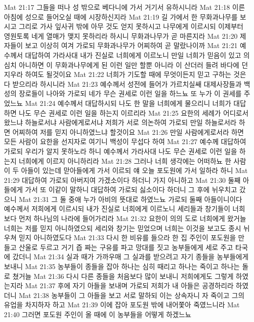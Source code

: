 Mat 21:17  그들을 떠나 성 밖으로 베다니에 가서 거기서 유하시니라
Mat 21:18  이른 아침에 성으로 들어오실 때에 시장하신지라
Mat 21:19  길 가에서 한 무화과나무를 보시고 그리로 가사 잎사귀 밖에 아무 것도 얻지 못하시고 나무에게 이르시되 이제부터 영원토록 네게 열매가 맺지 못하리라 하시니 무화과나무가 곧 마른지라
Mat 21:20  제자들이 보고 이상히 여겨 가로되 무화과나무가 어찌하여 곧 말랐나이까
Mat 21:21  예수께서 대답하여 가라사대 내가 진실로 너희에게 이르노니 만일 너희가 믿음이 있고 의심치 아니하면 이 무화과나무에게 된 이런 일만 할뿐 아니라 이 산더러 들려 바다에 던지우라 하여도 될것이요
Mat 21:22  너희가 기도할 때에 무엇이든지 믿고 구하는 것은 다 받으리라 하시니라
Mat 21:23  예수께서 성전에 들어가 가르치실쌔 대제사장들과 백성의 장로들이 나아와 가로되 네가 무슨 권세로 이런 일을 하느뇨 또 누가 이 권세를 주었느뇨
Mat 21:24  예수께서 대답하시되 나도 한 말을 너희에게 물으리니 너희가 대답하면 나도 무슨 권세로 이런 일을 하는지 이르리라
Mat 21:25  요한의 세례가 어디로서 왔느냐 하늘로서냐 사람에게로서냐 저희가 서로 의논하여 가로되 만일 하늘로서라 하면 어찌하여 저를 믿지 아니하였느냐 할것이요
Mat 21:26  만일 사람에게로서라 하면 모든 사람이 요한을 선지자로 여기니 백성이 무섭다 하여
Mat 21:27  예수께 대답하여 가로되 우리가 알지 못하노라 하니 예수께서 가라사대 나도 무슨 권세로 이런 일을 하는지 너희에게 이르지 아니하리라
Mat 21:28  그러나 너희 생각에는 어떠하뇨 한 사람이 두 아들이 있는데 맏아들에게 가서 이르되 얘 오늘 포도원에 가서 일하라 하니
Mat 21:29  대답하여 가로되 아버지여 가겠소이다 하더니 가지 아니하고
Mat 21:30  둘째 아들에게 가서 또 이같이 말하니 대답하여 가로되 싫소이다 하더니 그 후에 뉘우치고 갔으니
Mat 21:31  그 둘 중애 누가 아비의 뜻대로 하였느뇨 가로되 둘째 아들이니이다 예수께서 저희에게 이르시되 내가 진실로 너희에게 이르노니 세리들과 창기들이 너희보다 먼저 하나님의 나라에 들어가리라
Mat 21:32  요한이 의의 도로 너희에게 왔거늘 너희는 저를 믿지 아니하였으되 세리와 창기는 믿었으며 너희는 이것을 보고도 종시 뉘우쳐 믿지 아니하였도다
Mat 21:33  다시 한 비유를 들으라 한 집 주인이 포도원을 만들고 산울로 두르고 거기 즙 짜는 구유를 파고 망대를 짓고 농부들에게 세로 주고 타국에 갔더니
Mat 21:34  실과 때가 가까우매 그 실과를 받으려고 자기 종들을 농부들에게 보내니
Mat 21:35  농부들이 종들을 잡아 하나는 심히 때리고 하나는 죽이고 하나는 돌로 쳤거늘
Mat 21:36  다시 다른 종들을 처음보다 많이 보내니 저희에게도 그렇게 하였는지라
Mat 21:37  후에 자기 아들을 보내며 가로되 저희가 내 아들은 공경하리라 하였더니
Mat 21:38  농부들이 그 아들을 보고 서로 말하되 이는 상속자니 자 죽이고 그의 유업을 차지하자 하고
Mat 21:39  이에 잡아 포도원 밖에 내어쫓아 죽였느니라
Mat 21:40  그러면 포도원 주인이 올 때에 이 농부들을 어떻게 하겠느뇨
